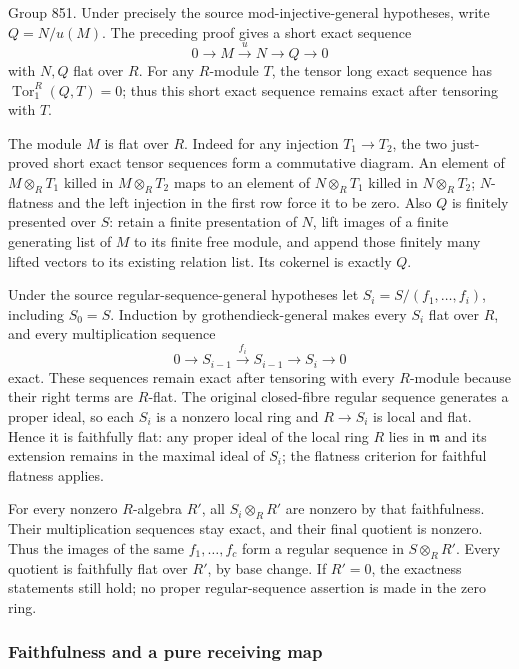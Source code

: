 Group 851. Under precisely the source mod-injective-general hypotheses, write \(Q=N/u(M)\). The preceding proof gives a short exact sequence \[
0\longrightarrow M\xrightarrow{u}N\longrightarrow Q\longrightarrow0
\] with \(N,Q\) flat over \(R\). For any \(R\)-module \(T\), the tensor long exact sequence has \(\operatorname{Tor}_1^R(Q,T)=0\); thus this short exact sequence remains exact after tensoring with \(T\).

The module \(M\) is flat over \(R\). Indeed for any injection \(T_1\to T_2\), the two just-proved short exact tensor sequences form a commutative diagram. An element of \(M\otimes_R T_1\) killed in \(M\otimes_R T_2\) maps to an element of \(N\otimes_R T_1\) killed in \(N\otimes_R T_2\); \(N\)-flatness and the left injection in the first row force it to be zero. Also \(Q\) is finitely presented over \(S\): retain a finite presentation of \(N\), lift images of a finite generating list of \(M\) to its finite free module, and append those finitely many lifted vectors to its existing relation list. Its cokernel is exactly \(Q\).

Under the source regular-sequence-general hypotheses let \(S_i=S/(f_1,\ldots,f_i)\), including \(S_0=S\). Induction by grothendieck-general makes every \(S_i\) flat over \(R\), and every multiplication sequence \[
0\longrightarrow S_{i-1}\xrightarrow{f_i}S_{i-1}
\longrightarrow S_i\longrightarrow0
\] exact. These sequences remain exact after tensoring with every \(R\)-module because their right terms are \(R\)-flat. The original closed-fibre regular sequence generates a proper ideal, so each \(S_i\) is a nonzero local ring and \(R\to S_i\) is local and flat. Hence it is faithfully flat: any proper ideal of the local ring \(R\) lies in \(\mathfrak m\) and its extension remains in the maximal ideal of \(S_i\); the flatness criterion for faithful flatness applies.

For every nonzero \(R\)-algebra \(R'\), all \(S_i\otimes_R R'\) are nonzero by that faithfulness. Their multiplication sequences stay exact, and their final quotient is nonzero. Thus the images of the same \(f_1,\ldots,f_c\) form a regular sequence in \(S\otimes_R R'\). Every quotient is faithfully flat over \(R'\), by base change. If \(R'=0\), the exactness statements still hold; no proper regular-sequence assertion is made in the zero ring.

\subsubsection{Faithfulness and a pure receiving map}\label{algebra-proof-038-faithfulness-and-a-pure-receiving-map}


